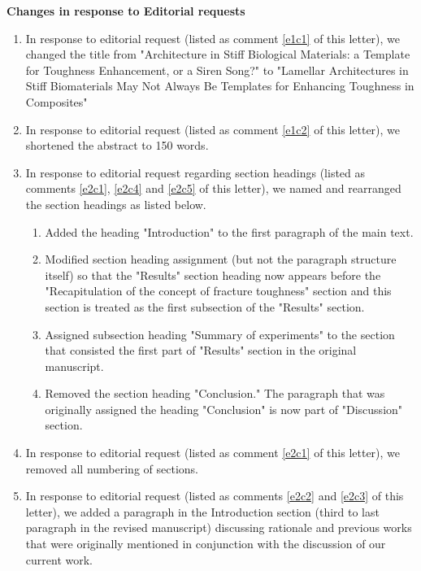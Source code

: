 \documentclass[11pt,letterpaper]{report}
\begin{document}
{\bf Changes in response to Editorial requests}
\begin{enumerate}[label=\textit{Ec.\arabic*}]

\item \label{Title1} In response to editorial request (listed as comment \ref{e1c1} of this letter), we changed the title from "Architecture in Stiff Biological Materials: a Template for Toughness Enhancement, or a Siren Song?" to "Lamellar Architectures in Stiff Biomaterials May Not Always Be Templates for Enhancing Toughness in Composites"
%
\item \label{Title2}
In response to editorial request (listed as comment \ref{e1c2} of this letter),  we shortened the abstract to 150 words.


\item \label{MainText1} In response to editorial request regarding section headings (listed as comments \ref{e2c1}, \ref{e2c4} and \ref{e2c5}  of this letter), we named and rearranged the section headings as listed below.
\begin{enumerate}[label=\textit{\ref{MainText1}.\roman*}]
    \item Added the heading "Introduction" to the first paragraph of the main text.
    \item Modified section heading assignment (but not the paragraph structure itself) so that the "Results" section heading now appears before the "Recapitulation of the concept of fracture toughness" section and this section is treated as the first subsection of the "Results" section.
    \item Assigned subsection heading "Summary of experiments" to the section that consisted the first part of "Results" section in the original manuscript.
    \item Removed the section heading "Conclusion." The paragraph that was originally assigned the heading "Conclusion" is now part of "Discussion" section.
\end{enumerate}

\item \label{MainText2} In response to editorial request (listed as comment \ref{e2c1} of this letter),  we removed all numbering of sections.


\item \label{MainText3} In response to editorial request (listed as comments \ref{e2c2} and \ref{e2c3} of this letter),  we added a paragraph in the Introduction section (third to last paragraph in the revised manuscript) discussing rationale and previous works that were originally mentioned in conjunction with the discussion of our current work.


\end{enumerate}
\end{document}
